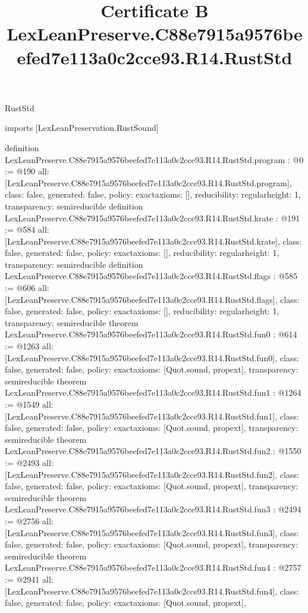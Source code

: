 \begin{lexlean}{RustStd}
\title{Certificate B LexLeanPreserve.C88e7915a9576beefed7e113a0c2cce93.R14.RustStd}
\begin{coremodule}
imports [LexLeanPreservation.RustSound]

definition LexLeanPreserve.C88e7915a9576beefed7e113a0c2cce93.R14.RustStd.program : @0 := @190 {
  all: [LexLeanPreserve.C88e7915a9576beefed7e113a0c2cce93.R14.RustStd.program],
  class: false,
  generated: false,
  policy: exact{axioms: []},
  reducibility: regular{height: 1},
  transparency: semireducible
}
definition LexLeanPreserve.C88e7915a9576beefed7e113a0c2cce93.R14.RustStd.krate : @191 := @584 {
  all: [LexLeanPreserve.C88e7915a9576beefed7e113a0c2cce93.R14.RustStd.krate],
  class: false,
  generated: false,
  policy: exact{axioms: []},
  reducibility: regular{height: 1},
  transparency: semireducible
}
definition LexLeanPreserve.C88e7915a9576beefed7e113a0c2cce93.R14.RustStd.flags : @585 := @606 {
  all: [LexLeanPreserve.C88e7915a9576beefed7e113a0c2cce93.R14.RustStd.flags],
  class: false,
  generated: false,
  policy: exact{axioms: []},
  reducibility: regular{height: 1},
  transparency: semireducible
}
theorem LexLeanPreserve.C88e7915a9576beefed7e113a0c2cce93.R14.RustStd.fun0 : @614 := @1263 {
  all: [LexLeanPreserve.C88e7915a9576beefed7e113a0c2cce93.R14.RustStd.fun0],
  class: false,
  generated: false,
  policy: exact{axioms: [Quot.sound, propext]},
  transparency: semireducible
}
theorem LexLeanPreserve.C88e7915a9576beefed7e113a0c2cce93.R14.RustStd.fun1 : @1264 := @1549 {
  all: [LexLeanPreserve.C88e7915a9576beefed7e113a0c2cce93.R14.RustStd.fun1],
  class: false,
  generated: false,
  policy: exact{axioms: [Quot.sound, propext]},
  transparency: semireducible
}
theorem LexLeanPreserve.C88e7915a9576beefed7e113a0c2cce93.R14.RustStd.fun2 : @1550 := @2493 {
  all: [LexLeanPreserve.C88e7915a9576beefed7e113a0c2cce93.R14.RustStd.fun2],
  class: false,
  generated: false,
  policy: exact{axioms: [Quot.sound, propext]},
  transparency: semireducible
}
theorem LexLeanPreserve.C88e7915a9576beefed7e113a0c2cce93.R14.RustStd.fun3 : @2494 := @2756 {
  all: [LexLeanPreserve.C88e7915a9576beefed7e113a0c2cce93.R14.RustStd.fun3],
  class: false,
  generated: false,
  policy: exact{axioms: [Quot.sound, propext]},
  transparency: semireducible
}
theorem LexLeanPreserve.C88e7915a9576beefed7e113a0c2cce93.R14.RustStd.fun4 : @2757 := @2941 {
  all: [LexLeanPreserve.C88e7915a9576beefed7e113a0c2cce93.R14.RustStd.fun4],
  class: false,
  generated: false,
  policy: exact{axioms: [Quot.sound, propext]},
}
\end{coremodule}
\end{lexlean}
